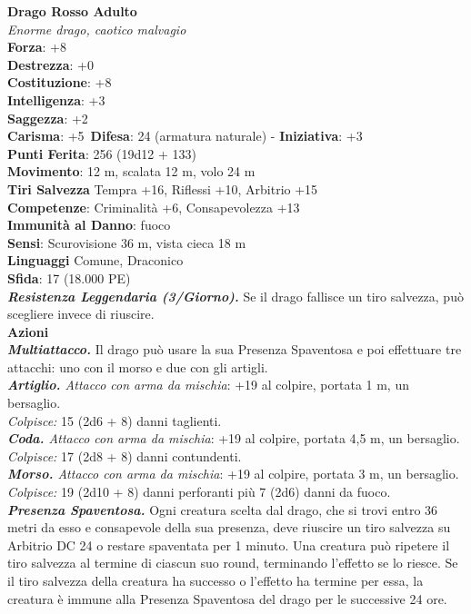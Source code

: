 \begin{multicols}{2}
\medskip\textbf{Drago Rosso Adulto}\\
\emph{Enorme drago, caotico malvagio}\\
\textbf{Forza}: +8\\
\textbf{Destrezza}: +0\\
\textbf{Costituzione}: +8\\
\textbf{Intelligenza}: +3\\
\textbf{Saggezza}: +2\\
\textbf{Carisma}: +5\
\textbf{Difesa}: 24 (armatura naturale) - \textbf{Iniziativa}: +3\\
\textbf{Punti Ferita}: 256 (19d12 + 133)\\
\textbf{Movimento}: 12 m, scalata 12 m, volo 24 m\\
\textbf{Tiri Salvezza} Tempra +16, Riflessi +10, Arbitrio +15\\
\textbf{Competenze}: Criminalità +6, Consapevolezza +13\\
\textbf{Immunità al Danno}: fuoco\\
\textbf{Sensi}: Scurovisione 36 m, vista cieca 18 m\\
\textbf{Linguaggi} Comune, Draconico\\
\textbf{Sfida}: 17 (18.000 PE)\smallskip\\
\emph{\textbf{Resistenza Leggendaria (3/Giorno).}} Se il drago fallisce un tiro salvezza, può scegliere invece di riuscire.\\
\smallskip\textbf{Azioni}\\
\emph{\textbf{Multiattacco.}} Il drago può usare la sua Presenza Spaventosa e poi effettuare tre attacchi: uno con il morso e due con gli artigli.\\
\emph{\textbf{Artiglio.} Attacco con arma da mischia}: +19 al colpire, portata 1 m, un bersaglio.\\
\emph{Colpisce:} 15 (2d6 + 8) danni taglienti.\\
\emph{\textbf{Coda.} Attacco con arma da mischia}: +19 al colpire, portata 4,5 m, un bersaglio.\\
\emph{Colpisce:} 17 (2d8 + 8) danni contundenti.\\
\emph{\textbf{Morso.} Attacco con arma da mischia}: +19 al colpire, portata 3 m, un bersaglio.\\
\emph{Colpisce:} 19 (2d10 + 8) danni perforanti più 7 (2d6) danni da fuoco.\\
\emph{\textbf{Presenza Spaventosa.}} Ogni creatura scelta dal drago, che si trovi entro 36 metri da esso e consapevole della sua presenza, deve riuscire un tiro salvezza su Arbitrio DC  24 o restare spaventata per 1 minuto. Una creatura può ripetere il tiro salvezza al termine di ciascun suo round, terminando l'effetto se lo riesce. Se il tiro salvezza della creatura ha successo o l'effetto ha termine per essa, la creatura è immune alla Presenza Spaventosa del drago per le successive 24 ore.\\

\end{multicols}
